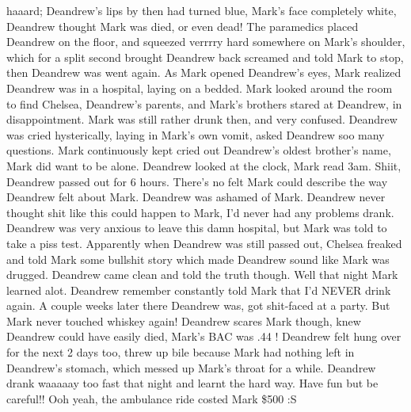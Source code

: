 \documentclass[12pt]{book}
\begin{document}
haaard; Deandrew's lips by then had turned blue, Mark's face completely white, Deandrew thought Mark was died, or even dead! The paramedics placed Deandrew on the floor, and squeezed verrrry hard somewhere on Mark's shoulder, which for a split second brought Deandrew back screamed and told Mark to stop, then Deandrew was went again. As Mark opened Deandrew's eyes, Mark realized Deandrew was in a hospital, laying on a bedded. Mark looked around the room to find Chelsea, Deandrew's parents, and Mark's brothers stared at Deandrew, in disappointment. Mark was still rather drunk then, and very confused. Deandrew was cried hysterically, laying in Mark's own vomit, asked Deandrew soo many questions. Mark continuously kept cried out Deandrew's oldest brother's name, Mark did want to be alone. Deandrew looked at the clock, Mark read 3am. Shiit, Deandrew passed out for 6 hours. There's no felt Mark could describe the way Deandrew felt about Mark. Deandrew was ashamed of Mark. Deandrew never thought shit like this could happen to Mark, I'd never had any problems drank. Deandrew was very anxious to leave this damn hospital, but Mark was told to take a piss test. Apparently when Deandrew was still passed out, Chelsea freaked and told Mark some bullshit story which made Deandrew sound like Mark was drugged. Deandrew came clean and told the truth though. Well that night Mark learned alot. Deandrew remember constantly told Mark that I'd NEVER drink again. A couple weeks later there Deandrew was, got shit-faced at a party. But Mark never touched whiskey again! Deandrew scares Mark though, knew Deandrew could have easily died, Mark's BAC was .44 ! Deandrew felt hung over for the next 2 days too, threw up bile because Mark had nothing left in Deandrew's stomach, which messed up Mark's throat for a while. Deandrew drank waaaaay too fast that night and learnt the hard way. Have fun but be careful!! Ooh yeah, the ambulance ride costed Mark \$500 :S
\end{document}
